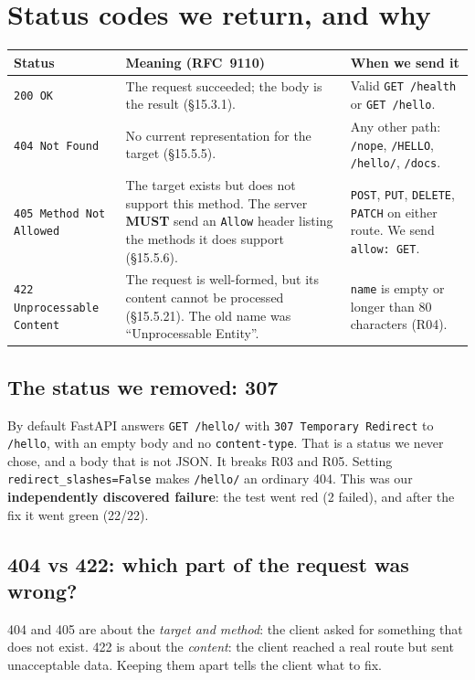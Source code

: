 \documentclass[11pt,a4paper]{article}
\newcommand{\code}[1]{\texttt{#1}}
\begin{document}
\section{Status codes we return, and why}

\begin{tabularx}{\linewidth}{@{}l L L@{}}
\toprule
\textbf{Status} & \textbf{Meaning (RFC~9110)} & \textbf{When we send it} \\
\midrule
\code{200 OK} & The request succeeded; the body is the result (\S15.3.1). &
Valid \code{GET /health} or \code{GET /hello}. \\
\code{404 Not Found} & No current representation for the target (\S15.5.5). &
Any other path: \code{/nope}, \code{/HELLO}, \code{/hello/}, \code{/docs}. \\
\code{405 Method Not Allowed} & The target exists but does not support this
method. The server \textbf{MUST} send an \code{Allow} header listing the methods
it does support (\S15.5.6). &
\code{POST}, \code{PUT}, \code{DELETE}, \code{PATCH} on either route. We send
\code{allow: GET}. \\
\code{422 Unprocessable Content} & The request is well-formed, but its content
cannot be processed (\S15.5.21). The old name was ``Unprocessable Entity''. &
\code{name} is empty or longer than 80 characters (R04). \\
\bottomrule
\end{tabularx}

\subsection{The status we removed: 307}
By default FastAPI answers \code{GET /hello/} with \code{307 Temporary
Redirect} to \code{/hello}, with an empty body and no \code{content-type}.
That is a status we never chose, and a body that is not JSON. It breaks R03
and R05. Setting \code{redirect\_slashes=False} makes \code{/hello/} an
ordinary 404. This was our \textbf{independently discovered failure}: the test
went red (2 failed), and after the fix it went green (22/22).

\subsection{404 vs 422: which part of the request was wrong?}
404 and 405 are about the \emph{target and method}: the client asked for
something that does not exist. 422 is about the \emph{content}: the client
reached a real route but sent unacceptable data. Keeping them apart tells the
client what to fix.
\end{document}
